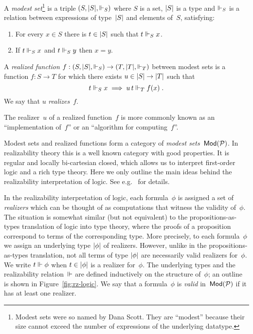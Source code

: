 \begin{definition}
  A \emph{modest set}\footnote{Modest sets were so named by Dana
    Scott. They are ``modest'' because their size cannot exceed the
    number of expressions of the underlying datatype.} is a triple
  $(S, |S|, {\Vdash_S})$ where $S$ is a set, $|S|$ is a type and
  $\Vdash_S$ is a relation between expressions of type~$|S|$ and
  elements of~$S$, satisfying:
  \begin{enumerate}
  \item For every $x \in S$ there is $t \in |S|$ such that $t \Vdash_S
    x$.
  \item If $t \Vdash_S x$ and $t \Vdash_S y$ then $x = y$.
  \end{enumerate}
  A \emph{realized function} $f : (S, |S|, {\Vdash_S}) \to (T, |T|,
  {\Vdash_T})$ between modest sets is a function $f : S \to T$ for which
  there exists $u \in |S| \to |T|$ such that
  \begin{equation*}
    t \Vdash_S x \implies u\,t \Vdash_T f(x) \;.
  \end{equation*}
  We say that $u$ \emph{realizes}~$f$.
\end{definition}

The realizer~$u$ of a realized function~$f$ is more commonly known as
an ``implementation of~$f$'' or an ``algorithm for computing~$f$''.

Modest sets and realized functions form a category of \emph{modest
  sets~$\mathsf{Mod}(\mathcal{P})$}. In realizability theory this is a well known
category with good properties. It is regular and locally bi-cartesian
closed, which allows us to interpret first-order logic and a rich type
theory. Here we only outline the main ideas behind the realizability
interpretation of logic. See e.g.~\cite{Bauer:00} for details.

In the realizability interpretation of logic, each formula~$\phi$ is
assigned a set of \emph{realizers} which can be thought of as
computations that witness the validity of~$\phi$. The situation is
somewhat similar (but not equivalent) to the propositions-as-types
translation of logic into type theory, where the proofs of a
proposition correspond to terms of the corresponding type. More
precisely, to each formula~$\phi$ we assign an underlying type
$|\phi|$ of realizers. However, unlike in the propositions-as-types
translation, not all terms of type $|\phi|$ are necessarily valid
realizers for~$\phi$. We write $t \Vdash \phi$ when $t \in |\phi|$ is
a realizer for~$\phi$. The underlying types and the
realizability relation~$\Vdash$ are defined inductively on the structure
of~$\phi$; an outline is shown in Figure~\ref{fig:rz-logic}. We say that a
formula~$\phi$ is \emph{valid} in~$\mathsf{Mod}(\mathcal{P})$ if it has at least one
realizer.

